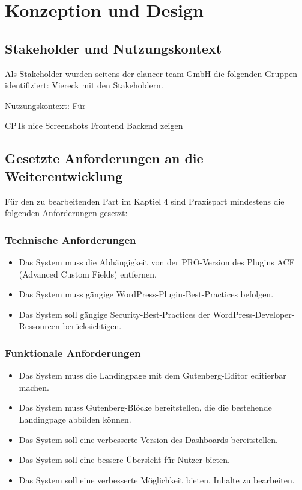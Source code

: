 \chapter{Konzeption und Design}

\section{Stakeholder und Nutzungskontext}
Als Stakeholder wurden seitens der elancer-team GmbH die folgenden Gruppen identifiziert:
Viereck mit den Stakeholdern.

Nutzungskontext: Für

CPTs nice
Screenshots Frontend Backend zeigen
\section{Gesetzte Anforderungen an die Weiterentwicklung}

Für den zu bearbeitenden Part im Kaptiel 4 sind Praxispart mindestens die folgenden Anforderungen gesetzt:
\subsection{Technische Anforderungen}
\begin{itemize}
    \item Das System muss die Abhängigkeit von der PRO-Version des Plugins ACF (Advanced Custom Fields) entfernen.
    \item Das System muss gängige WordPress-Plugin-Best-Practices befolgen.
    \item Das System soll gängige Security-Best-Practices der WordPress-Developer-Ressourcen berücksichtigen.
\end{itemize}



\subsection{Funktionale Anforderungen}
\begin{itemize}
    \item Das System muss die Landingpage mit dem Gutenberg-Editor editierbar machen.
    \item Das System muss Gutenberg-Blöcke bereitstellen, die die bestehende Landingpage abbilden können.
    \item Das System soll eine verbesserte Version des Dashboards bereitstellen.
    \item Das System soll eine bessere Übersicht für Nutzer bieten.
    \item Das System soll eine verbesserte Möglichkeit bieten, Inhalte zu bearbeiten.
\end{itemize}


